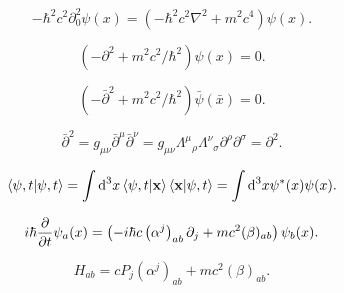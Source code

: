 \begin{equation}
	- \hbar^2 c^2 \partial_0^2 \psi(x) = (- \hbar^2 c^2 \nabla^2 + m^2 c^4) \psi(x).
\end{equation}

\begin{equation}
	(- \partial^2 + m^2 c^2 / \hbar^2) \psi(x) = 0.
\end{equation}

\begin{equation}
	(- \bar\partial^2 + m^2 c^2 / \hbar^2) \bar\psi(\bar{x}) = 0.
\end{equation}

\begin{equation}
	\bar\partial^2 = g_{\mu\nu} \bar\partial^\mu \bar\partial^\nu = g_{\mu\nu} \Lambda^\mu{}_\rho \Lambda^\nu{}_\sigma \partial^\rho \partial^\sigma = \partial^2.
\end{equation}

\begin{equation}
	\left\langle \psi, t \middle| \psi ,t \right\rangle = \int \text{d}^{3}x \left\langle \psi, t \middle| \mathbf{x} \right\rangle \left\langle \mathbf{x} \middle| \psi, t \right\rangle = \int \text{d}^{3}x \psi^*(x) \psi(x).
\end{equation}

\begin{equation}
	i\hbar \frac{\partial{}}{\partial{t}} \psi_a(x) = \left( -i\hbar c \left(\alpha^j\right)_{ab} \partial_j + mc^2 (\beta)_{ab} \right) \psi_b (x).
\end{equation}

\begin{equation}
	H_{ab} = c P_j \left( \alpha^j \right)_{ab} + mc^2 (\beta)_{ab}.
\end{equation}